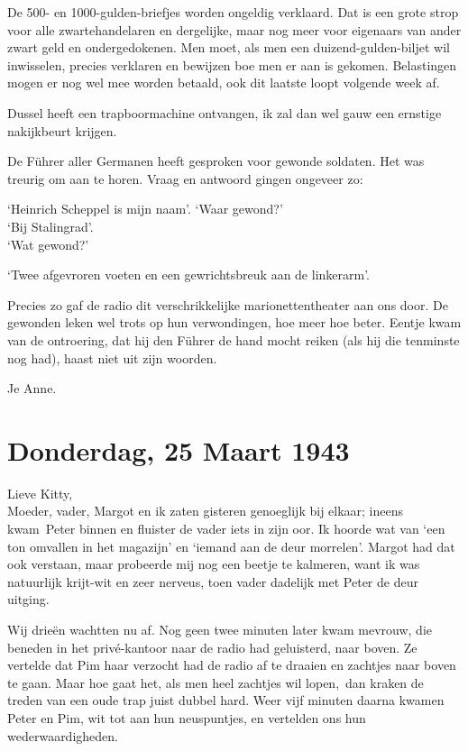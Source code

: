 \documentclass{book}
\begin{document}
De 500- en 1000-gulden-briefjes worden ongeldig verklaard. Dat is een grote
strop voor alle zwartehandelaren en dergelijke, maar nog meer voor eigenaars van
ander zwart geld en ondergedokenen. Men moet, als men een duizend-gulden-biljet
wil inwisselen, precies verklaren en bewijzen boe men er aan is gekomen.
Belastingen mogen er nog wel mee worden betaald, ook dit laatste loopt volgende
week af.

Dussel heeft een trapboormachine ontvangen, ik zal dan wel gauw een ernstige
nakijkbeurt krijgen.

De Führer aller Germanen heeft gesproken voor gewonde soldaten. Het was treurig
om aan te horen. Vraag en antwoord gingen ongeveer zo:

`Heinrich Scheppel is mijn naam'. `Waar gewond?'\\
`Bij Stalingrad'.\\
`Wat
gewond?'

`Twee afgevroren voeten en een gewrichtsbreuk aan de linkerarm'.

Precies zo gaf de radio dit verschrikkelijke marionettentheater aan ons door. De
gewonden leken wel trots op hun verwondingen, hoe meer hoe beter. Eentje kwam
van de ontroering, dat hij den Führer de hand mocht reiken (als hij die
tenminste nog had), haast niet uit zijn woorden.

Je Anne.

\section*{Donderdag, 25 Maart 1943}

Lieve Kitty,\\
Moeder, vader, Margot en ik zaten gisteren genoeglijk bij elkaar;
ineens kwam~Peter binnen en fluister de vader iets in zijn oor. Ik hoorde wat
van `een ton omvallen in het magazijn' en `iemand aan de deur morrelen'. Margot
had dat ook verstaan, maar probeerde mij nog een beetje te kalmeren, want ik was
natuurlijk krijt-wit en zeer nerveus, toen vader dadelijk met Peter de deur
uitging.

Wij drieën wachtten nu af. Nog geen twee minuten later kwam mevrouw, die beneden
in het privé-kantoor naar de radio had geluisterd, naar boven.  Ze vertelde dat
Pim haar verzocht had de radio af te draaien en zachtjes naar boven te gaan.
Maar hoe gaat het, als men heel zachtjes wil lopen,~dan kraken de treden van een
oude trap juist dubbel hard. Weer vijf minuten daarna kwamen Peter en Pim, wit
tot aan hun neuspuntjes, en vertelden ons hun wederwaardigheden.
\end{document}
